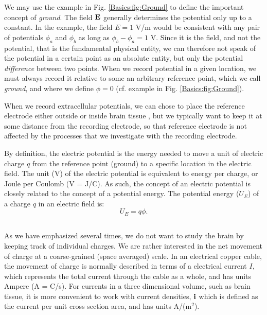 We may use the example in Fig. \ref{Basics:fig:Ground} to define the important concept of \textit{ground}. The field ${\bf E}$ generally determines the potential only up to a constant. In the example, the field $E = 1$ V/m would be consistent with any pair of potentials $\phi_a$ and $\phi_b$ as long as $\phi_b - \phi_a =  1$ V. Since it is the field, and not the potential, that is the fundamental physical entity, we can therefore not speak of the potential in a certain point as an absolute entity, but only the potential \textit{difference} between two points. When we record potential in a given location, we must always record it relative to some an arbitrary reference point, which we call \textit{ground}, and where we define $\phi = 0$ (cf. example in Fig. \ref{Basics:fig:Ground}). 

When we record extracellular potentials, we can chose to place the reference electrode either outside or inside brain tissue \cite{Sharott2015}, but we typically want to keep it at some distance from the recording electrode, so that reference electrode is not affected by the processes that we investigate with the recording electrode. 

By definition, the electric potential is the energy needed to move a unit of electric charge $q$ from the reference point (ground) to a specific location in the electric field. The unit (V) of the electric potential is equivalent to energy per charge, or Joule per Coulomb (V = J/C). As such, the concept of an electric potential is closely related to the concept of a potential energy. The potential energy ($U_E$) of a charge $q$ in an electric field is:
\begin{equation}
U_E = q\phi.
\label{Basics:eq:UE}
\end{equation}


\subsection{}
\label{sec:Basics:Current} 
As we have emphasized several times, we do not want to study the brain by keeping track of individual charges. We are rather interested in the net movement of charge at a coarse-grained (space averaged) scale. In an electrical copper cable, the movement of charge is normally described in terms of a electrical current $I$, which represents the total current through the cable as a whole, and has units Ampere (A = C/s). For currents in a three dimensional volume, such as brain tissue, it is more convenient to work with current densities, ${\bf i}$  which is defined as the current per unit cross section area, and has units A/(m$^2$).

